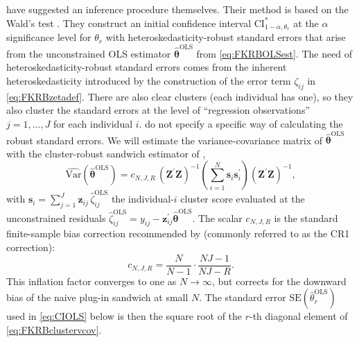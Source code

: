 \citet{FoxKimRyanBajari2011} have suggested an inference procedure themselves.
Their method is based on the Wald's test \citep{Wald1943}.
They construct an initial confidence interval $\mathrm{CI}^{*}_{1-\alpha, \theta_r}$ at the $\alpha$ significance level for $\theta_r$ with heteroskedasticity-robust standard errors that arise from the unconstrained OLS estimator $\hat{\bm{\theta}}^{\mathrm{OLS}}$ from \cref{eq:FKRBOLSest}.
The need of heteroskedasticity-robust standard errors comes from the inherent heteroskedasticity introduced by the construction of the error term $\zeta_{ij}$ in \cref{eq:FKRBzetadef}.
There are also clear clusters (each individual has one), so they also cluster the standard errors at the level of ``regression observations'' $j = 1,\ldots,J$ for each individual $i$.
\citet{FoxKimRyanBajari2011} do not specify a specific way of calculating the robust standard errors.
We will estimate the variance-covariance matrix of $\hat{\bm{\theta}}^{\mathrm{OLS}}$ with the cluster-robust sandwich estimator of \citet{LiangZeger1986},
\begin{equation}
\label{eq:FKRBclustervcov}
    \widehat{\mathrm{Var}}\!\left(\hat{\bm{\theta}}^{\mathrm{OLS}}\right) = c_{N,J,R}\,(\bm{Z}^\prime\bm{Z})^{-1}\!\left(\sum_{i=1}^{N} \bm{s}_i \bm{s}_i^\prime\right)\!(\bm{Z}^\prime\bm{Z})^{-1},
\end{equation}
with $\bm{s}_i = \sum_{j=1}^{J} \bm{z}_{ij}\,\hat{\zeta}_{ij}^{\mathrm{OLS}}$ the individual-$i$ cluster score evaluated at the unconstrained residuals $\hat{\zeta}_{ij}^{\mathrm{OLS}} = y_{ij} - \bm{z}_{ij}^\prime \hat{\bm{\theta}}^{\mathrm{OLS}}$.
The scalar $c_{N,J,R}$ is the standard finite-sample bias correction recommended by \citet{CameronMiller2015} (commonly referred to as the CR1 correction):
\begin{equation}
\label{eq:FKRBclusterbc}
    c_{N,J,R} = \frac{N}{N-1}\cdot\frac{NJ-1}{NJ-R}.
\end{equation}
This inflation factor converges to one as $N\to\infty$, but corrects for the downward bias of the naive plug-in sandwich at small $N$.
The standard error $\mathrm{SE}(\hat{\theta}_r^{\mathrm{OLS}})$ used in \cref{eq:CIOLS} below is then the square root of the $r$-th diagonal element of \cref{eq:FKRBclustervcov}.

